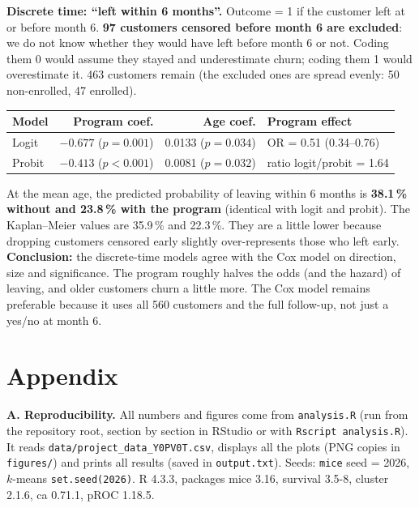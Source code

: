 \documentclass[10pt,a4paper]{article}
\begin{document}
\textbf{Discrete time: ``left within 6 months''.} Outcome = 1 if the customer left at or before month 6. \textbf{97 customers censored before month 6 are excluded}: we do not know whether they would have left before month 6 or not. Coding them 0 would assume they stayed and underestimate churn; coding them 1 would overestimate it. 463 customers remain (the excluded ones are spread evenly: 50 non-enrolled, 47 enrolled).

\begin{table}[H]
\centering
\begin{tabular}{lrrl}
\toprule
Model & Program coef. & Age coef. & Program effect \\
\midrule
Logit  & $-0.677$ ($p = 0.001$)   & 0.0133 ($p = 0.034$) & OR = 0.51 (0.34--0.76) \\
Probit & $-0.413$ ($p < 0.001$)   & 0.0081 ($p = 0.032$) & ratio logit/probit = 1.64 \\
\bottomrule
\end{tabular}
\end{table}

At the mean age, the predicted probability of leaving within 6 months is \textbf{38.1\,\% without and 23.8\,\% with the program} (identical with logit and probit). The Kaplan--Meier values are 35.9\,\% and 22.3\,\%. They are a little lower because dropping customers censored early slightly over-represents those who left early. \textbf{Conclusion:} the discrete-time models agree with the Cox model on direction, size and significance. The program roughly halves the odds (and the hazard) of leaving, and older customers churn a little more. The Cox model remains preferable because it uses all 560 customers and the full follow-up, not just a yes/no at month 6.

\newpage

\section*{Appendix}

\textbf{A. Reproducibility.} All numbers and figures come from \texttt{analysis.R} (run from the repository root, section by section in RStudio or with \texttt{Rscript analysis.R}). It reads \texttt{data/project\_data\_Y0PV0T.csv}, displays all the plots (PNG copies in \texttt{figures/}) and prints all results (saved in \texttt{output.txt}). Seeds: \texttt{mice} seed = 2026, $k$-means \texttt{set.seed(2026)}. R 4.3.3, packages mice 3.16, survival 3.5-8, cluster 2.1.6, ca 0.71.1, pROC 1.18.5.
\end{document}
